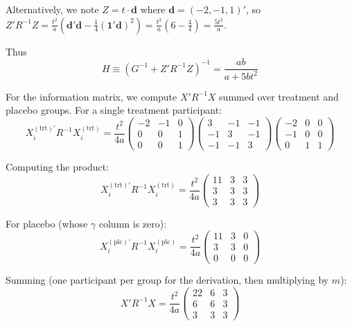 \documentclass[
  11pt,
]{article}
\begin{document}
Alternatively, we note \(Z = t \cdot \mathbf{d}\) where
\(\mathbf{d} = (-2,-1,1)'\), so \(Z'R^{-1}Z =
\frac{t^2}{a}(\mathbf{d}'\mathbf{d} -
\frac{1}{4}(\mathbf{1}'\mathbf{d})^2) =
\frac{t^2}{a}(6 - \frac{4}{4}) = \frac{5t^2}{a}\).

Thus \begin{equation}
  H \equiv (G^{-1}+Z'R^{-1}Z)^{-1}
  = \frac{ab}{a + 5bt^2}
\end{equation}

For the information matrix, we compute \(X'R^{-1}X\) summed over
treatment and placebo groups. For a single treatment participant: \[
  X_i^{(\text{trt})\prime} R^{-1} X_i^{(\text{trt})}
  = \frac{t^2}{4a}\begin{pmatrix}
    -2 & -1 & 0 \\ 0 & 0 & 1 \\ 0 & 0 & 1
  \end{pmatrix}
  \begin{pmatrix}
    3&-1&-1\\-1&3&-1\\-1&-1&3
  \end{pmatrix}
  \begin{pmatrix}
    -2&0&0\\-1&0&0\\0&1&1
  \end{pmatrix}
\]

Computing the product: \begin{equation}
  X_i^{(\text{trt})\prime} R^{-1} X_i^{(\text{trt})}
  = \frac{t^2}{4a}\begin{pmatrix}
    11 & 3 & 3 \\ 3 & 3 & 3 \\ 3 & 3 & 3
  \end{pmatrix}
\end{equation}

For placebo (whose \(\gamma\) column is zero): \begin{equation}
  X_i^{(\text{plc})\prime} R^{-1} X_i^{(\text{plc})}
  = \frac{t^2}{4a}\begin{pmatrix}
    11 & 3 & 0 \\ 3 & 3 & 0 \\ 0 & 0 & 0
  \end{pmatrix}
\end{equation}

Summing (one participant per group for the derivation, then multiplying
by \(m\)): \begin{equation}
  X'R^{-1}X = \frac{t^2}{4a}\begin{pmatrix}
    22 & 6 & 3 \\ 6 & 6 & 3 \\ 3 & 3 & 3
  \end{pmatrix}
\end{equation}
\end{document}
